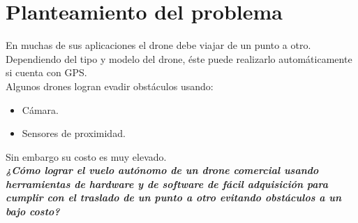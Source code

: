 
\section{Planteamiento del problema}

En muchas de sus aplicaciones el drone debe viajar de un punto a otro. Dependiendo del tipo y modelo del drone, éste puede realizarlo automáticamente si cuenta con GPS. \\

Algunos drones logran evadir obstáculos usando:

\begin{itemize}
	\item Cámara.
	\item Sensores de proximidad.
\end{itemize}

Sin embargo su costo es muy elevado. \\

\textit{\textbf{¿Cómo lograr el vuelo autónomo de un drone comercial usando herramientas de hardware y de software de fácil adquisición para cumplir con el traslado de un punto a otro evitando obstáculos a un bajo costo?}}